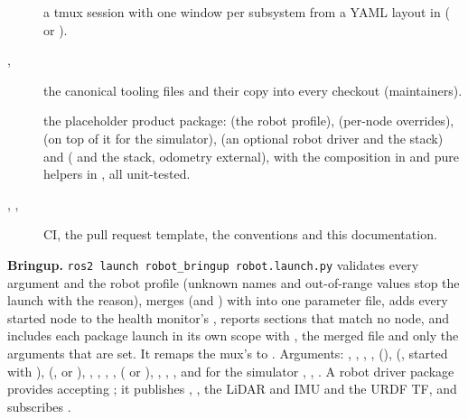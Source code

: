 \begin{description}
  \item[] a tmux session with one window per subsystem from a YAML
    layout in  ( or ).
  \item[, ] the canonical tooling files and their
    copy into every checkout (maintainers).
  \item[] the placeholder product package:  (the
    robot profile),  (per-node overrides),  (on
    top of it for the simulator),  (an optional robot driver and the
    stack) and  ( and the stack, odometry external),
    with the composition in  and pure helpers in
    , all unit-tested.
  \item[, , ] CI, the pull request template,
    the conventions and this documentation.
\end{description}

\textbf{Bringup.} \texttt{ros2 launch robot\_bringup robot.launch.py} validates every argument
and the robot profile (unknown names and out-of-range values stop the launch with the reason),
merges  (and ) with  into one parameter file,
adds every started node to the health monitor's , reports sections that
match no node, and includes each package launch in its own scope with , the
merged file and only the arguments that are set. It remaps the mux's  to
. Arguments: , ,
, ,  (), 
(, started with ),
 (,  or ), ,
, , , 
( or ), ,
, , and for the simulator , ,
. A robot driver package provides  accepting
; it publishes , , the LiDAR and IMU and
the URDF TF, and subscribes .

